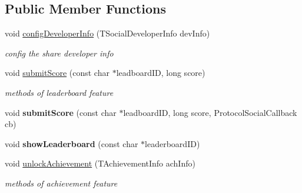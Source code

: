 \subsection*{Public Member Functions}
\begin{DoxyCompactItemize}
\item 
void \hyperlink{classcocos2d_1_1plugin_1_1ProtocolSocial_a804a22f9b68ed86375eafdc794a6cb80}{config\+Developer\+Info} (T\+Social\+Developer\+Info dev\+Info)
\begin{DoxyCompactList}\small\item\em config the share developer info \end{DoxyCompactList}\item 
\mbox{\label{classcocos2d_1_1plugin_1_1ProtocolSocial_acb7327e02c6d34265c7a9bc5610b80c6}} 
void \hyperlink{classcocos2d_1_1plugin_1_1ProtocolSocial_acb7327e02c6d34265c7a9bc5610b80c6}{submit\+Score} (const char $\ast$leadboard\+ID, long score)
\begin{DoxyCompactList}\small\item\em methods of leaderboard feature \end{DoxyCompactList}\item 
\mbox{\label{classcocos2d_1_1plugin_1_1ProtocolSocial_af397cbc87001a3076d8044ff1758bba2}} 
void {\bfseries submit\+Score} (const char $\ast$leadboard\+ID, long score, Protocol\+Social\+Callback cb)
\item 
\mbox{\label{classcocos2d_1_1plugin_1_1ProtocolSocial_a89f82b20b9e1bb323913214a5eca7981}} 
void {\bfseries show\+Leaderboard} (const char $\ast$leaderboard\+ID)
\item 
\mbox{\label{classcocos2d_1_1plugin_1_1ProtocolSocial_a0dc7a58c1f2850b25d3b903332c1e79f}} 
void \hyperlink{classcocos2d_1_1plugin_1_1ProtocolSocial_a0dc7a58c1f2850b25d3b903332c1e79f}{unlock\+Achievement} (T\+Achievement\+Info ach\+Info)
\begin{DoxyCompactList}\small\item\em methods of achievement feature \end{DoxyCompactList}\item 
\mbox{\label{classcocos2d_1_1plugin_1_1ProtocolSocial_a3c1729056bb1d8ea5923492adfb7cd62}} 

\end{DoxyCompactItemize}
